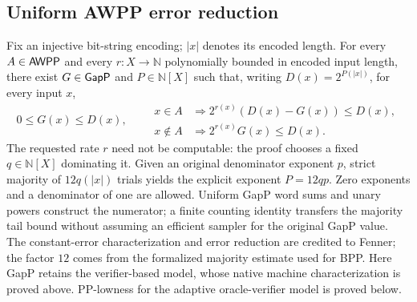\begin{result}
\subsection{Uniform AWPP error reduction}
Fix an injective bit-string encoding; $|x|$ denotes its encoded length. For every
$A\in\mathsf{AWPP}$ and every $r:X\to\mathbb{N}$ polynomially bounded in encoded
input length, there exist $G\in\mathsf{GapP}$ and $P\in\mathbb{N}[X]$ such that,
writing $D(x)=2^{P(|x|)}$, for every input $x$,
\[
0\leq G(x)\leq D(x),\qquad
\begin{aligned}
x\in A&\Rightarrow 2^{r(x)}(D(x)-G(x))\leq D(x),\\
x\notin A&\Rightarrow 2^{r(x)}G(x)\leq D(x).
\end{aligned}
\]
The requested rate $r$ need not be computable: the proof chooses a fixed
$q\in\mathbb{N}[X]$ dominating it. Given an original denominator exponent $p$,
strict majority of $12q(|x|)$ trials yields the explicit exponent $P=12qp$.
Zero exponents and a denominator of one are allowed. Uniform GapP word sums and
unary powers construct the numerator; a finite counting identity transfers the
majority tail bound without assuming an efficient sampler for the original GapP
value. The constant-error characterization and error reduction are credited to
Fenner; the factor $12$ comes from the formalized majority estimate used for BPP.
Here GapP retains the verifier-based model, whose native machine characterization
is proved above. PP-lowness for the adaptive oracle-verifier model is proved below.
\citep{Fenner2003}\citep[Section 7.4.1]{AroraBarak09}

\end{result}


